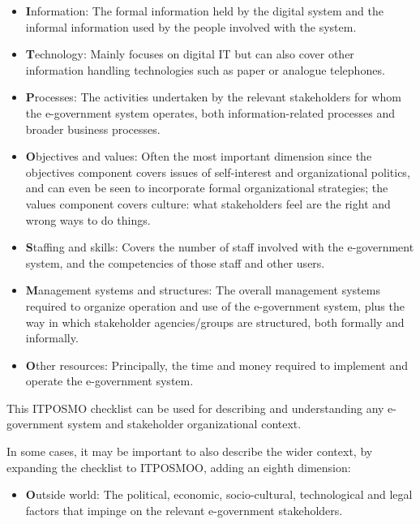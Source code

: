 \begin{itemize}
	\item \textbf{I}nformation: The formal information held by the digital system and the informal information used by the people
	involved with the system.
	
	\item \textbf{T}echnology: Mainly focuses on digital IT but can also cover other information	handling technologies such as paper or analogue telephones.
	
	\item \textbf{P}rocesses: The activities undertaken by the relevant stakeholders for whom the
	e-government system operates, both information-related processes and broader business processes.
	
	\item \textbf{O}bjectives and values: Often the most
	important dimension since the objectives
	component covers issues of self-interest
	and organizational politics, and can
	even be seen to incorporate formal organizational strategies; the values component covers culture: what stakeholders feel are the right and wrong ways to do
	things.
	
	\item \textbf{S}taffing and skills: Covers the number of
	staff involved with the e-government
	system, and the competencies of those
	staff and other users.
	
	\item \textbf{M}anagement systems and structures: The
	overall management systems required
	to organize operation and use of the
	e-government system, plus the way
	in which stakeholder agencies/groups
	are structured, both formally and
	informally.
	
	\item \textbf{O}ther resources: Principally, the time
	and money required to implement and
	operate the e-government system.
\end{itemize}

This ITPOSMO checklist can be used
for describing and understanding any
e-government system and stakeholder
organizational context.

In some cases, it may be important to also
describe the wider context, by expanding
the checklist to ITPOSMOO, adding an
eighth dimension:


\begin{itemize}
	\item \textbf{O}utside world: The political, economic,
	socio-cultural, technological and legal
	factors that impinge on the relevant
	e-government stakeholders.
\end{itemize}

